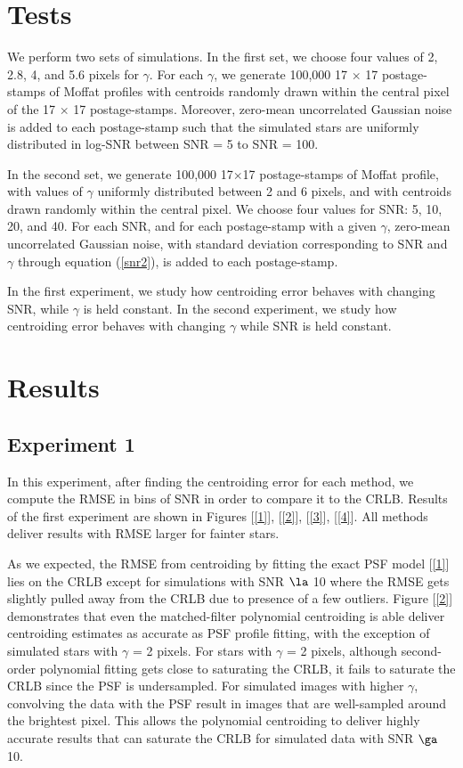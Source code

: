 \documentclass[12pt, preprint]{aastex}
\begin{document}
\section{Tests}\label{sec:data}

We perform two sets of simulations. In the first set, we choose four values of
2, 2.8, 4, and 5.6 pixels for $\gamma$. For each $\gamma$, we generate 100,000 
17 $\times$ 17 postage-stamps of Moffat profiles with centroids randomly drawn
within the central pixel of the 17 $\times$ 17 postage-stamps. Moreover, zero-mean 
uncorrelated Gaussian noise is added to each postage-stamp such that the simulated 
stars are uniformly distributed in log-SNR between SNR = 5 to SNR = 100.

In the second set, we generate 100,000 17$\times$17 postage-stamps
of Moffat profile, with values of $\gamma$ uniformly distributed 
between 2 and 6 pixels, and with centroids drawn randomly within 
the central pixel. We choose four values for SNR: 5, 10, 20, and 40. 
For each SNR, and for each postage-stamp with a given $\gamma$, 
zero-mean uncorrelated Gaussian noise, with standard deviation corresponding 
to SNR and $\gamma$ through equation (\ref{snr2}), is added to each postage-stamp.

In the first experiment, we study how centroiding error behaves with changing
SNR, while $\gamma$ is held constant. In the second experiment, we study 
how centroiding error behaves with changing $\gamma$ while SNR is held constant.

\section{Results}\label{sec:result}

\subsection{Experiment 1}
   
In this experiment, after finding the centroiding error for each method,
we compute the RMSE in bins of SNR in order to compare it to the CRLB. 
Results of the first experiment are shown in Figures [\ref{1}], [\ref{2}],
[\ref{3}], [\ref{4}]. All methods deliver results with RMSE larger 
for fainter stars.

As we expected, the RMSE from centroiding by fitting the exact PSF model [\ref{1}]
lies on the CRLB except for simulations with SNR $\la$ 10 where the RMSE gets slightly pulled away
from the CRLB due to presence of a few outliers. Figure [\ref{2}] demonstrates that even the matched-filter polynomial 
centroiding is able deliver centroiding estimates as accurate as PSF profile fitting, with the exception
of simulated stars with $\gamma$ = 2 pixels. For stars with $\gamma$ = 2 pixels, although second-order polynomial
fitting gets close to saturating the CRLB, it fails to saturate the CRLB since the PSF is undersampled. For simulated images with higher $\gamma$, convolving the
data with the PSF result in images that are well-sampled around the brightest pixel. This allows the 
polynomial centroiding to deliver highly accurate results that can saturate the CRLB for simulated
data with SNR $\ga$ 10.
\end{document}
